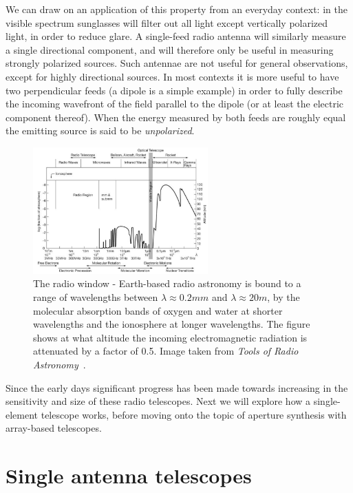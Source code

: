 We can draw on an application of this property from an everyday context: in the visible spectrum sunglasses will filter out all light except vertically polarized light, in order to reduce glare. A single-feed radio 
antenna will similarly measure a single directional component, and will therefore only be useful in measuring strongly polarized sources. Such antennae are not useful for general observations, except for highly directional
sources. In most contexts it is more useful to have two perpendicular feeds (a dipole is a simple example) in order to fully describe the incoming wavefront of the field parallel to the dipole (or at least 
the electric component thereof). When the energy measured by both feeds are roughly equal the emitting source is said to be \textit{unpolarized}.
\begin{figure}[ht]
 \begin{mdframed}
 \centering
 \includegraphics[width=0.6\textwidth]{images/radio_window.png}
 \caption[The radio window]{The radio window - Earth-based radio astronomy is bound to a range of wavelengths between $\lambda\approx 0.2mm$ and $\lambda\approx 20m$, by the molecular absorption bands of oxygen and water at
 shorter wavelengths and the ionosphere at longer wavelengths. The figure shows at what altitude the incoming electromagnetic radiation is attenuated by a factor of 0.5. Image taken from \textit{Tools of Radio Astronomy}~\cite{wilson2009tools}.}
 \label{fig_radio_window}
 \end{mdframed}
\end{figure}

Since the early days significant progress has been made towards increasing in the sensitivity and size of these radio telescopes. Next we will explore 
how a single-element telescope works, before moving onto the topic of aperture synthesis with array-based telescopes.

\section{Single antenna telescopes}
